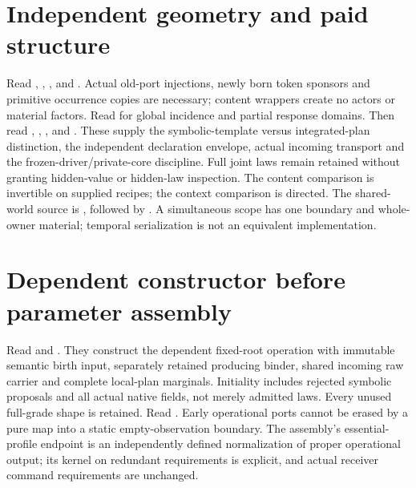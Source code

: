 \documentclass{article}
\begin{document}
\section{Independent geometry and paid structure}
Read , , , and . Actual old-port injections, newly born token sponsors and primitive occurrence copies are necessary; content wrappers create no actors or material factors. Read  for global incidence and partial response domains.
Then read , , , and . These supply the symbolic-template versus integrated-plan distinction, the independent declaration envelope, actual incoming transport and the frozen-driver/private-core discipline. Full joint laws remain retained without granting hidden-value or hidden-law inspection. The content comparison is invertible on supplied recipes; the context comparison is directed.
The shared-world source is , followed by . A simultaneous scope has one boundary and whole-owner material; temporal serialization is not an equivalent implementation.
\section{Dependent constructor before parameter assembly}
Read  and . They construct the dependent fixed-root operation with immutable semantic birth input, separately retained producing binder, shared incoming raw carrier and complete local-plan marginals. Initiality includes rejected symbolic proposals and all actual native fields, not merely admitted laws. Every unused full-grade shape is retained.
Read . Early operational ports cannot be erased by a pure map into a static empty-observation boundary. The assembly's essential-profile endpoint is an independently defined normalization of proper operational output; its kernel on redundant requirements is explicit, and actual receiver command requirements are unchanged.
\end{document}
